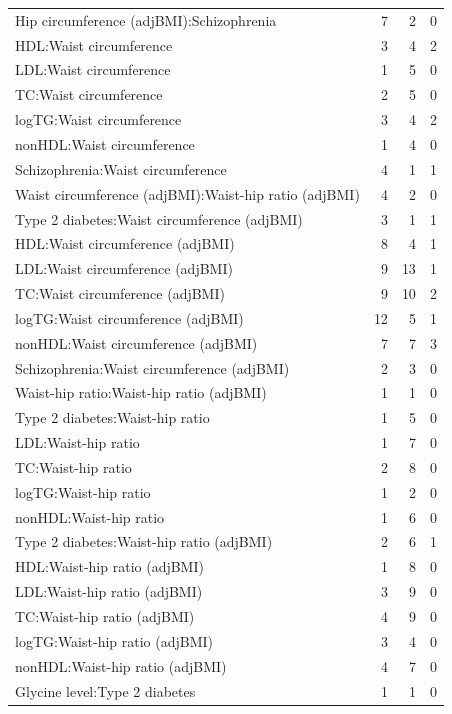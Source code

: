 \begin{table}[ht]
\begin{tabular}{lrrr}
  Hip circumference (adjBMI):Schizophrenia &   7 &   2 &   0 \\ 
  HDL:Waist circumference &   3 &   4 &   2 \\ 
  LDL:Waist circumference &   1 &   5 &   0 \\ 
  TC:Waist circumference &   2 &   5 &   0 \\ 
  logTG:Waist circumference &   3 &   4 &   2 \\ 
  nonHDL:Waist circumference &   1 &   4 &   0 \\ 
  Schizophrenia:Waist circumference &   4 &   1 &   1 \\ 
  Waist circumference (adjBMI):Waist-hip ratio (adjBMI) &   4 &   2 &   0 \\ 
  Type 2 diabetes:Waist circumference (adjBMI) &   3 &   1 &   1 \\ 
  HDL:Waist circumference (adjBMI) &   8 &   4 &   1 \\ 
  LDL:Waist circumference (adjBMI) &   9 &  13 &   1 \\ 
  TC:Waist circumference (adjBMI) &   9 &  10 &   2 \\ 
  logTG:Waist circumference (adjBMI) &  12 &   5 &   1 \\ 
  nonHDL:Waist circumference (adjBMI) &   7 &   7 &   3 \\ 
  Schizophrenia:Waist circumference (adjBMI) &   2 &   3 &   0 \\ 
  Waist-hip ratio:Waist-hip ratio (adjBMI) &   1 &   1 &   0 \\ 
  Type 2 diabetes:Waist-hip ratio &   1 &   5 &   0 \\ 
  LDL:Waist-hip ratio &   1 &   7 &   0 \\ 
  TC:Waist-hip ratio &   2 &   8 &   0 \\ 
  logTG:Waist-hip ratio &   1 &   2 &   0 \\ 
  nonHDL:Waist-hip ratio &   1 &   6 &   0 \\ 
  Type 2 diabetes:Waist-hip ratio (adjBMI) &   2 &   6 &   1 \\ 
  HDL:Waist-hip ratio (adjBMI) &   1 &   8 &   0 \\ 
  LDL:Waist-hip ratio (adjBMI) &   3 &   9 &   0 \\ 
  TC:Waist-hip ratio (adjBMI) &   4 &   9 &   0 \\ 
  logTG:Waist-hip ratio (adjBMI) &   3 &   4 &   0 \\ 
  nonHDL:Waist-hip ratio (adjBMI) &   4 &   7 &   0 \\ 
  Glycine level:Type 2 diabetes &   1 &   1 &   0 \\ 

\end{tabular}
\end{table}
